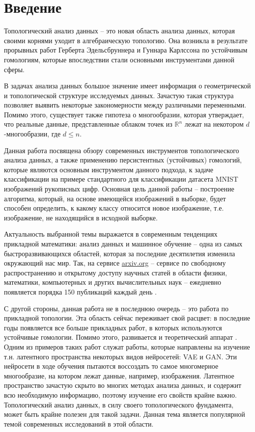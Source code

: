 \chapter*{\centering Введение}

Топологический анализ данных -- это новая область анализа данных, которая своими корнями уходит в алгебраическую топологию. Она возникла в результате прорывных работ Герберта Эдельсбруннера \cite{Edelsbrunner} и Гуннара Карлссона \cite{Zomorodian} по устойчивым гомологиям, которые впоследствии стали основными инструментами данной сферы. 

В задачах анализа данных большое значение имеет информация о геометрической и топологической структуре исследуемых данных. Зачастую такая структура позволяет выявить некоторые закономерности между различными переменными. Помимо этого, существует также гипотеза о многообразии, которая утверждает, что реальные данные, представленные облаком точек из $\mathbb{R}^n$ лежат на некотором $d$-многообразии, где $d \leq n$. \

Данная работа посвящена обзору современных инструментов топологического анализа данных, а также применению персистентных (устойчивых) гомологий, которые являются основным инструментом данного подхода, к задаче классификации на примере стандартного для классификации датасета MNIST изображений рукописных цифр. Основная цель данной работы -- построение алгоритма, который, на основе имеющейся изображений в выборке, будет способен определить, к какому классу относится новое изображение, т.е. изображение, не находящийся в исходной выборке. 

Актуальность выбранной темы выражается в современным тенденциях прикладной математики: анализ данных и машинное обучение -- одна из самых быстроразвивающихся областей, которая за последние десятилетия изменила окружающий нас мир. Так, на сервисе \url{arxiv.org} -- сервисе по свободному распространению и открытому доступу научных статей в области физики, математики, компьютерных и других вычислительных наук -- ежедневно появляется порядка 150 публикаций каждый день \cite{arxiv-recent-ml}. 

С другой стороны, данная работа не в последнюю очередь -- это работа по прикладной топологии. Эта область сейчас переживает свой расцвет: в последние годы появляется все больше прикладных работ, в которых используются устойчивые гомологии. Помимо этого, развивается и теоретический аппарат \cite{Manin}. Одним из примеров таких работ служат работы, которые направлены на изучение т.н. латентного пространства некоторых видов нейросетей: VAE и GAN. Эти нейросети в ходе обучения пытаются воссоздать то самое многомерное многообразие, на котором лежат данные, например, изображения. Латентное пространство зачастую скрыто во многих методах анализа данных, и содержит всю необходимую информацию, поэтому изучение его свойств крайне важно. Топологический анализ данных, в силу своего топологического фундамента, может быть крайне полезен для такой задачи. Данная тема является популярной темой современных исследований в этой области\cite{topae, charlier2019phomgem, schiff2021characterizing, topogan}. 

